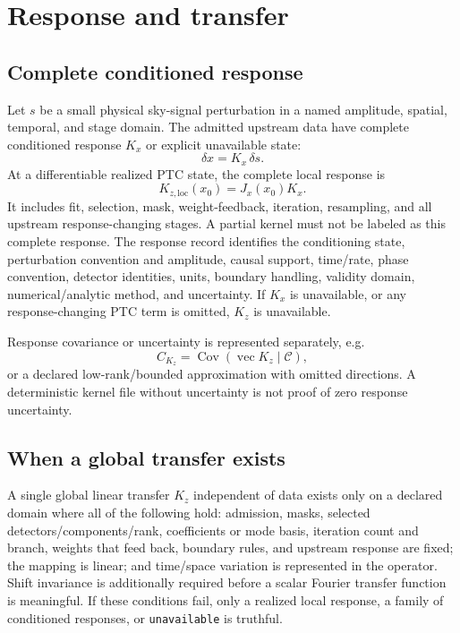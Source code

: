 \documentclass[11pt]{article}
\newcommand{\unknown}{\texttt{unavailable}}
\newcommand{\Cov}{\operatorname{Cov}}
\begin{document}
\section{Response and transfer}
\label{sec:response}

\subsection{Complete conditioned response}

Let $s$ be a small physical sky-signal perturbation in a named amplitude,
spatial, temporal, and stage domain.  The admitted upstream data have complete
conditioned response $K_x$ or explicit unavailable state:
\begin{equation}
 \delta x=K_x\,\delta s.
 \label{eq:upstream-response}
\end{equation}
At a differentiable realized PTC state, the complete local response is
\begin{equation}
 K_{z,\mathrm{loc}}(x_0)=J_x(x_0)K_x.
 \label{eq:local-response}
\end{equation}
It includes fit, selection, mask, weight-feedback, iteration, resampling, and
all upstream response-changing stages.  A partial kernel must not be labeled
as this complete response.  The response record identifies the conditioning
state, perturbation convention and amplitude, causal support, time/rate,
phase convention, detector identities, units, boundary handling, validity
domain, numerical/analytic method, and uncertainty.  If $K_x$ is unavailable,
or any response-changing PTC term is omitted, $K_z$ is unavailable.

Response covariance or uncertainty is represented separately, e.g.
\begin{equation}
 C_{K_z}=\Cov\!\left(\operatorname{vec}K_z\mid\mathcal C\right),
 \label{eq:response-covariance}
\end{equation}
or a declared low-rank/bounded approximation with omitted directions.  A
deterministic kernel file without uncertainty is not proof of zero response
uncertainty.

\subsection{When a global transfer exists}

A single global linear transfer $K_z$ independent of data exists only on a
declared domain where all of the following hold: admission, masks, selected
detectors/components/rank, coefficients or mode basis, iteration count and
branch, weights that feed back, boundary rules, and upstream response are
fixed; the mapping is linear; and time/space variation is represented in the
operator.  Shift invariance is additionally required before a scalar Fourier
transfer function is meaningful.  If these conditions fail, only a realized
local response, a family of conditioned responses, or \unknown{} is truthful.
\end{document}
